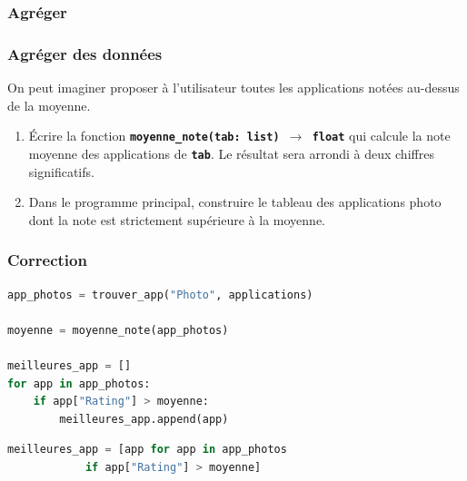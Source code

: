 \documentclass[svgnames,11pt]{beamer}
\begin{document}
\subsubsection{Agréger}
\begin{frame}
    \frametitle{Agréger des données}

    On peut imaginer proposer à l'utilisateur toutes les applications notées au-dessus de la moyenne.
    \begin{activite}
        \begin{enumerate}
            \item Écrire la fonction \textbf{\texttt{moyenne\_note(tab: list)  $\rightarrow$ float}} qui calcule la note moyenne des applications de \texttt{\textbf{tab}}. Le résultat sera arrondi à deux chiffres significatifs.
            \item Dans le programme principal, construire le tableau des applications photo dont la note est strictement supérieure à la moyenne.
        \end{enumerate}
    \end{activite}
\end{frame}
\begin{frame}
    \frametitle{Correction}

    

\end{frame}
\begin{frame}[fragile]

    \begin{center}
        \begin{lstlisting}[language=Python, basicstyle=\ttfamily\small, xleftmargin=.5em, xrightmargin=0em]
app_photos = trouver_app("Photo", applications)

moyenne = moyenne_note(app_photos)

meilleures_app = []
for app in app_photos:
    if app["Rating"] > moyenne:
        meilleures_app.append(app)
\end{lstlisting}
        \label{CODE}
    \end{center}
\begin{center}
\begin{lstlisting}[language=Python , basicstyle=\ttfamily\small, xleftmargin=2em, xrightmargin=2em]
meilleures_app = [app for app in app_photos 
            if app["Rating"] > moyenne]
\end{lstlisting}
\label{CODE}
\end{center}
\end{frame}
\end{document}
